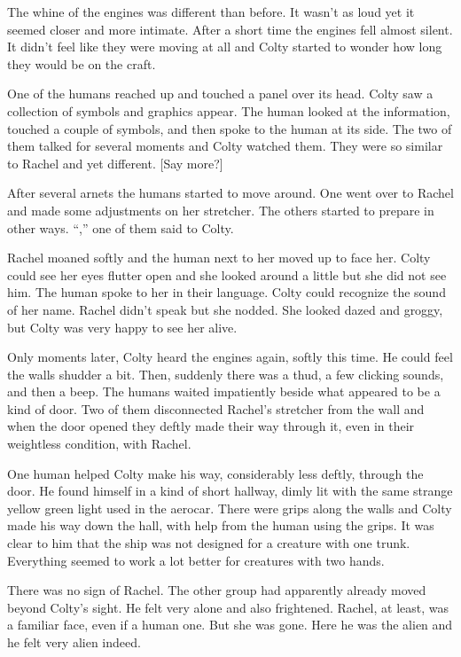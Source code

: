 The whine of the engines was different than before. It wasn't as loud yet it seemed closer and
more intimate. After a short time the engines fell almost silent. It didn't feel like they were
moving at all and Colty started to wonder how long they would be on the craft.

One of the humans reached up and touched a panel over its head. Colty saw a collection of
symbols and graphics appear. The human looked at the information, touched a couple of symbols,
and then spoke to the human at its side. The two of them talked for several moments and Colty
watched them. They were so similar to Rachel and yet different. [Say more?]

After several arnets the humans started to move around. One went over to Rachel and made some
adjustments on her stretcher. The others started to prepare in other ways. ``,'' one of them said to Colty.

Rachel moaned softly and the human next to her moved up to face her. Colty could see her eyes
flutter open and she looked around a little but she did not see him. The human spoke to her in
their language. Colty could recognize the sound of her name. Rachel didn't speak but she nodded.
She looked dazed and groggy, but Colty was very happy to see her alive.

Only moments later, Colty heard the engines again, softly this time. He could feel the walls
shudder a bit. Then, suddenly there was a thud, a few clicking sounds, and then a beep. The
humans waited impatiently beside what appeared to be a kind of door. Two of them disconnected
Rachel's stretcher from the wall and when the door opened they deftly made their way through it,
even in their weightless condition, with Rachel.

One human helped Colty make his way, considerably less deftly, through the door. He found
himself in a kind of short hallway, dimly lit with the same strange yellow green light used in
the aerocar. There were grips along the walls and Colty made his way down the hall, with help
from the human using the grips. It was clear to him that the ship was not designed for a
creature with one trunk. Everything seemed to work a lot better for creatures with two hands.

There was no sign of Rachel. The other group had apparently already moved beyond Colty's sight.
He felt very alone and also frightened. Rachel, at least, was a familiar face, even if a human
one. But she was gone. Here he was the alien and he felt very alien indeed.

